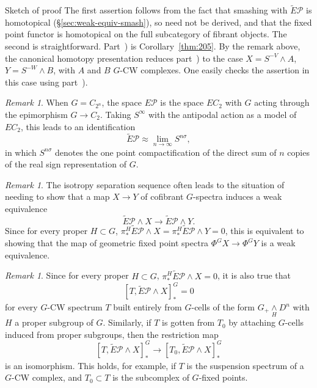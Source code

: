 \documentclass{amsart}
\newtheorem{rem}[equation]{Remark}
\theoremstyle{definition}
\theoremstyle{remark}
\newtheorem{rem}[equation]{Remark}
\newenvironment{pf*}[1]{\bigskip{\em #1:\/}}{\qed\medskip}
\newcommand{\thmListItem}[1]{\rm \romannumeral#1)}
\newcommand{\smashove}[1]{\underset{#1}{\wedge}}
\newcommand{\gfp}[1]{\Phi^{#1}}
\newcommand{\phig}{\gfp{G}}
\newcommand{\tepfam}{\tilde E\pfamily}
\newcommand{\zt}{C_{2}}
\newcommand{\ztn}{C_{2^{n}}}
\newcommand{\pfamily}{\mathcal P}
\begin{document}
\begin{pf*}{Sketch of proof}
The first assertion follows from the fact that smashing with $\tilde
E\pfamily$ is homotopical (\S\ref{sec:weak-equiv-smash}), so need not
be derived, and that the fixed point functor is homotopical on the
full subcategory of fibrant objects.  The second is straightforward.
Part~\thmListItem{3} is Corollary~\ref{thm:205}.  By the remark
above, the canonical
homotopy presentation reduces part~\thmListItem{4} to the case
$X=S^{-V}\wedge A$, $Y=S^{-W}\wedge B$, with $A$ and $B$ $G$-CW
complexes.  One easily checks the assertion in this case using
part~\thmListItem{3}.
\end{pf*}



\begin{rem}
\label{rem:42} 
When $G=\ztn$, the space $E\pfamily$ is the space
$E\zt$ with $G$ acting through the epimorphism $G\to\zt$.   Taking
$S^{\infty}$ with the antipodal action as a model of $E\zt$, this
leads to an identification
\[
\tepfam \approx \lim_{n\to\infty} S^{n\sigma},
\]
in which $S^{n\sigma}$ denotes the one point compactification of the
direct sum of $n$ copies of the real sign representation of $G$.
\end{rem}

\begin{rem}
\label{rem:8} The isotropy separation sequence often leads to the
situation of needing to show that a map $X\to Y$ of cofibrant
$G$-spectra induces a weak equivalence
\[
\tilde E\pfamily\wedge X\to \tilde E\pfamily\wedge Y.
\]
Since for every proper $H\subset G$, $\pi^{H}_{\ast}\tilde E\pfamily
\wedge X=\pi^{H}_{\ast}\tilde E\pfamily\wedge Y=0$, this is
equivalent to showing that the map of geometric fixed point spectra
$\phig X\to \phig Y$ is a weak equivalence.
\end{rem}

\begin{rem}
\label{rem:20} Since for every proper $H\subset G$,
$\pi^{H}_{\ast}\tilde E\pfamily\wedge X=0$, it is also true that
\[
[T,\tilde E\pfamily\wedge X]^{G}_{\ast} = 0
\]
for every $G$-CW spectrum $T$ built entirely from $G$-cells of the
form $G_{+}\smashove{H}D^{n}$ with $H$ a proper subgroup of $G$.
Similarly, if $T$ is gotten from $T_{0}$ by attaching $G$-cells
induced from proper subgroups, then the restriction map
\[
[T,\tilde E\pfamily\wedge X]^{G}_{\ast} \to
[T_{0},\tilde E\pfamily\wedge X]^{G}_{\ast}
\]
is an isomorphism.  This holds, for example, if $T$ is the suspension
spectrum of a $G$-CW complex, and $T_{0}\subset T$ is the subcomplex
of $G$-fixed points.
\end{rem}
\end{document}
